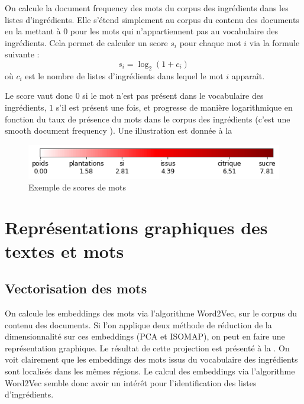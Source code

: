         On calcule la \og document frequency \fg des mots du corpus des ingrédients dans les listes d'ingrédients.
        Elle s'étend simplement au corpus du contenu des documents en la mettant à 0 pour les mots qui n'appartiennent pas au vocabulaire des ingrédients.
        Cela permet de calculer un score $s_{i}$ pour chaque mot $i$ via la formule suivante :
        \[s_{i} = \log_{2}(1 + c_{i})\]
        où $c_{i}$ est le nombre de listes d'ingrédients dans lequel le mot $i$ apparaît.
       
        Le score vaut donc $0$ si le mot n'est pas présent dans le vocabulaire des ingrédients, $1$ s'il est présent une fois, et progresse de manière logarithmique en fonction du taux de présence du mots dans le corpus des ingrédients (c'est une \og smooth document frequency \fg). Une illustration est donnée à la 

        \begin{figure}[htbp]
            \begin{center}
            \includegraphics[width=0.6\linewidth]{img/scores_bar.png}
            \end{center}
            \caption{Exemple de scores de mots}
            \label{fig:scores_bar}
        \end{figure}

        \section{Représentations graphiques des textes et mots}

            \subsection{Vectorisation des mots}

            On calcule les embeddings des mots via l'algorithme Word2Vec, sur le corpus du contenu des documents.
            Si l'on applique deux méthode de réduction de la dimensionnalité sur ces embeddings (PCA et ISOMAP), on peut en faire une représentation graphique.
            Le résultat de cette projection est présenté à la .
            On voit clairement que les embeddings des mots issus du vocabulaire des ingrédients sont localisés dans les mêmes régions.
            Le calcul des embeddings via l'algorithme Word2Vec semble donc avoir un intérêt pour l'identification des listes d'ingrédients. 

